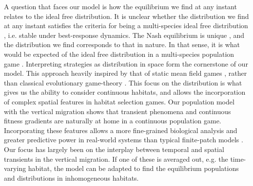 A question that faces our model is how the equilibrium we find at any instant relates to the ideal free distribution. It is unclear whether the distribution we find at any instant satisfies the criteria for being a multi-species ideal free distribution \citep{kvrivan2008ideal}, i.e. stable under best-response dynamics. The Nash equilibrium is unique \citep{verticalmigration}, and the distribution we find corresponds to that in nature. In that sense, it is what would be expected of the ideal free distribution in a multi-species population game \citep{cressman2004ideal}.
Interpreting strategies as distribution in space form the cornerstone of our model. This approach heavily inspired by that of static mean field games \citep{lasry2007mean, blanchet2016optimal}, rather than classical evolutionary game-theory \cite{hofbauer1998evolutionary}. This focus on the distribution is what gives us the ability to consider continuous habitats, and allows the incorporation of complex spatial features in habitat selection games. Our population model with the vertical migration shows that transient phenomena and continuous fitness gradients \citep{kawecki2004conceptual} are naturally at home in a continuous population game. Incorporating these features allows a more fine-grained biological analysis and greater predictive power in real-world systems than typical finite-patch models \citep{kvrivan2008ideal, sadowski2019predator}. Our focus has largely been on the interplay between temporal and spatial transients in the vertical migration. If one of these is averaged out, e.g. the time-varying habitat, the model can be adapted to find the equilibrium populations and distributions in inhomogeneous habitats.







